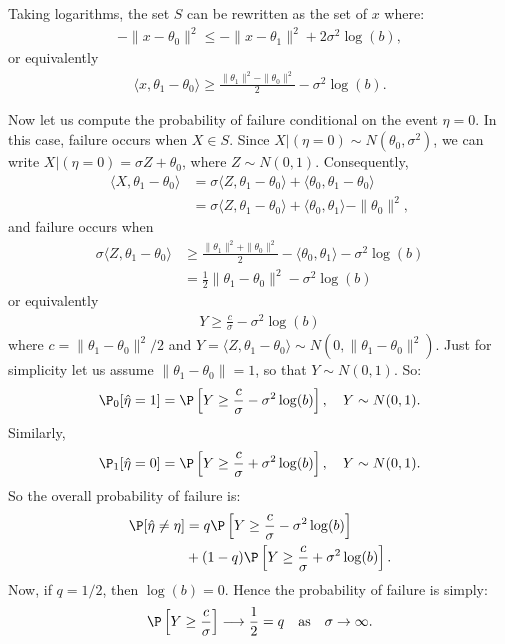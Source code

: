 \documentclass[9pt,twocolumn,twoside,lineno]{pnas-new}
\begin{document}
Taking logarithms, the set $S$ can be rewritten as the set of $x$ where:
\begin{align*}
%
-\| x - \theta_0\|^2 \le - \|x - \theta_1\|^2 + 2 \sigma^2 \log(b),
%
\end{align*}
%
or equivalently
%
\begin{align*}
%
\langle x , \theta_1 - \theta_0 \rangle 
\ge \frac{\|\theta_1\|^2 - \|\theta_0\|^2}{2} - \sigma^2 \log(b).
%
\end{align*}
%

Now let us compute the probability of failure conditional on the event $\eta = 0$. In this case, failure occurs when $X \in S$. Since $X|(\eta=0) \sim N(\theta_0,\sigma^2)$, we can write $X | (\eta=0) = \sigma Z + \theta_0$, where $Z \sim N(0,1)$. Consequently,
%
\begin{align*}
%
\langle X , \theta_1 - \theta_0 \rangle 
&= \sigma \langle Z , \theta_1 - \theta_0 \rangle 
+ \langle \theta_0,\theta_1 - \theta_0 \rangle
\nonumber \\
&= \sigma \langle Z , \theta_1 - \theta_0 \rangle 
+ \langle \theta_0,\theta_1 \rangle - \|\theta_0\|^2,
%
\end{align*}
%
and failure occurs when 
%
\begin{align}
%
\sigma\langle Z, \theta_1 - \theta_0 \rangle 
&\ge \frac{\|\theta_1\|^2 + \|\theta_0\|^2}{2} - \langle \theta_0,\theta_1 \rangle
- \sigma^2 \log(b)
\nonumber \\
&= \frac{1}{2} \|\theta_1 - \theta_0\|^2 - \sigma^2 \log(b)
%
\end{align}
%
or equivalently
%
\begin{align*}
%
Y \ge \frac{c}{\sigma} - \sigma^2 \log(b)
%
\end{align*}
%
where $c = \|\theta_1 - \theta_0\|^2 / 2$ and $Y = \langle Z , \theta_1 - \theta_0 \rangle \sim N(0,\|\theta_1 - \theta_0\|^2)$. 
Just for simplicity let us assume $\| \theta_1 - \theta_0\| = 1$, so that $Y \sim N(0,1)$. So:
%
\begin{align*}
%
\P_0[\hat{\eta} = 1] = \P\left[Y \ge \frac{c}{\sigma} - \sigma^2 \log(b) \right],
\quad Y \sim N(0,1).
%
\end{align*}
%
Similarly,
%
\begin{align*}
%
\P_1[\hat{\eta} = 0] = \P\left[Y \ge \frac{c}{\sigma} + \sigma^2 \log(b) \right],
\quad Y \sim N(0,1).
%
\end{align*}
%
So the overall probability of failure is:
%
\begin{align*}
%
\P[\hat{\eta} \ne \eta]
&= q \P\left[Y \ge \frac{c}{\sigma} - \sigma^2 \log(b) \right]
\\&+ (1-q) \P\left[Y \ge \frac{c}{\sigma} + \sigma^2 \log(b) \right].
%
\end{align*}
%
Now, if $q = 1/2$, then $\log(b) = 0$. Hence the probability of failure is simply:
%
\begin{align}
%
\P\left[Y \ge \frac{c}{\sigma} \right] \longrightarrow \frac{1}{2} = q
\quad \text{as} \quad \sigma \to \infty.
%
\end{align}
\end{document}
